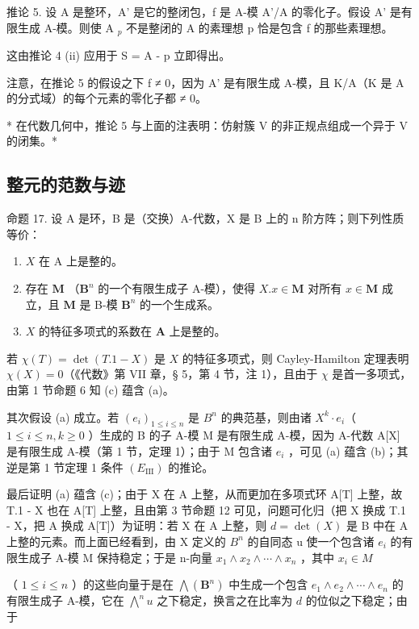 推论 5. 设 A 是整环，A' 是它的整闭包，f 是 A-模 A'/A 的零化子。假设 A' 是有限生成 A-模。则使 A \(_{p}\) 不是整闭的 A 的素理想 p 恰是包含 f 的那些素理想。

这由推论 4 (ii) 应用于 S = A - p 立即得出。

注意，在推论 5 的假设之下 f ≠ 0，因为 A' 是有限生成 A-模，且 K/A（K 是 A 的分式域）的每个元素的零化子都 ≠ 0。

* 在代数几何中，推论 5 与上面的注表明：仿射簇 V 的非正规点组成一个异于 V 的闭集。*

\subsection{整元的范数与迹}

命题 17. 设 A 是环，B 是（交换）A-代数，X 是 B 上的 n 阶方阵；则下列性质等价：

\begin{enumerate}
\def\labelenumi{(\alph{enumi})}
\item
  \(X\) 在 A 上是整的。
\item
  存在 \(\mathbf{M}\) （\(\mathbf{B}^n\) 的一个有限生成子 A-模），使得 \(X.x\in \mathbf{M}\) 对所有 \(x\in \mathbf{M}\) 成立，且 \(\mathbf{M}\) 是 B-模 \(\mathbf{B}^n\) 的一个生成系。
\item
  \(X\) 的特征多项式的系数在 \(\mathbf{A}\) 上是整的。
\end{enumerate}

  若 \(\chi(T) = \det(T.1 - X)\) 是 \(X\) 的特征多项式，则 Cayley-Hamilton 定理表明 \(\chi(X) = 0\)（《代数》第 VII 章，§ 5，第 4 节，注 1），且由于 \(\chi\) 是首一多项式，由第 1 节命题 6 知 (c) 蕴含 (a)。

  其次假设 (a) 成立。若 \((e_i)_{1 \leqslant i \leqslant n}\) 是 \(B^n\) 的典范基，则由诸 \(X^k \cdot e_i\)（ \(1 \leqslant i \leqslant n, k \geqslant 0\) ）生成的 B 的子 A-模 M 是有限生成 A-模，因为 A-代数 A[X] 是有限生成 A-模（第 1 节，定理 1）；由于 M 包含诸 \(e_i\) ，可见 (a) 蕴含 (b)；其逆是第 1 节定理 1 条件 \((E_{\mathrm{III}})\) 的推论。

  最后证明 (a) 蕴含 (c)；由于 X 在 A 上整，从而更加在多项式环 A[T] 上整，故 T.1 - X 也在 A[T] 上整，且由第 3 节命题 12 可见，问题可化归（把 X 换成 T.1 - X，把 A 换成 A[T]）为证明：若 X 在 A 上整，则 \(d = \det(X)\) 是 B 中在 A 上整的元素。而上面已经看到，由 X 定义的 \(B^{n}\) 的自同态 u 使一个包含诸 \(e_{i}\) 的有限生成子 A-模 M 保持稳定；于是 n-向量 \(x_{1} \wedge x_{2} \wedge \cdots \wedge x_{n}\) ，其中 \(x_{i} \in M\)

（ \(1 \leqslant i \leqslant n\) ）的这些向量于是在 \(\bigwedge (\mathbf{B}^n)\) 中生成一个包含 \(e_1 \wedge e_2 \wedge \cdots \wedge e_n\) 的有限生成子 A-模，它在 \(\bigwedge^n u\) 之下稳定，换言之在比率为 \(d\) 的位似之下稳定；由于

